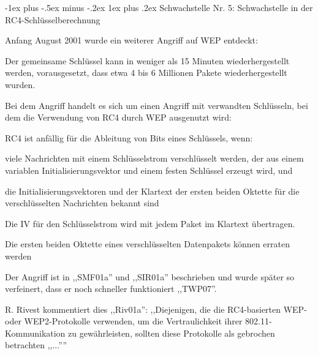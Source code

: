 \documentclass[a4paper]{article}
\makeatletter
\renewcommand{\subsubsection}{\@startsection{subsubsection}{3}{0mm}%
 {-1ex plus -.5ex minus -.2ex}%
 {1ex plus .2ex}%
 {\normalfont\small\bfseries}}
\makeatother
\begin{document}
\begin{multicols}{3}
      \subsubsection{Schwachstelle Nr. 5: Schwachstelle in der RC4-Schlüsselberechnung}
      \begin{itemize*}
            \item Anfang August 2001 wurde ein weiterer Angriff auf WEP entdeckt:
            \begin{itemize*}
                  \item Der gemeinsame Schlüssel kann in weniger als 15 Minuten wiederhergestellt werden, vorausgesetzt, dass etwa 4 bis 6 Millionen Pakete wiederhergestellt wurden.
                  \item Bei dem Angriff handelt es sich um einen Angriff mit verwandten Schlüsseln, bei dem die Verwendung von RC4 durch WEP ausgenutzt wird:
                  \begin{itemize*}
                        \item RC4 ist anfällig für die Ableitung von Bits eines Schlüssels, wenn:
                        \begin{itemize*}
                              \item viele Nachrichten mit einem Schlüsselstrom verschlüsselt werden, der aus einem variablen Initialisierungsvektor und einem festen Schlüssel erzeugt wird, und
                              \item die Initialisierungsvektoren und der Klartext der ersten beiden Oktette für die verschlüsselten Nachrichten bekannt sind
                        \end{itemize*}
                        \item Die IV für den Schlüsselstrom wird mit jedem Paket im Klartext übertragen.
                        \item Die ersten beiden Oktette eines verschlüsselten Datenpakets können erraten werden
                  \end{itemize*}
                  \item Der Angriff ist in ,,SMF01a'' und ,,SIR01a'' beschrieben und wurde später so verfeinert, dass er noch schneller funktioniert ,,TWP07''.
                  \item R. Rivest kommentiert dies ,,Riv01a'': ,,Diejenigen, die die RC4-basierten WEP- oder WEP2-Protokolle verwenden, um die Vertraulichkeit ihrer 802.11-Kommunikation zu gewährleisten, sollten diese Protokolle als gebrochen betrachten ,,...''''
            \end{itemize*}
      \end{itemize*}


\end{multicols}
\end{document}
